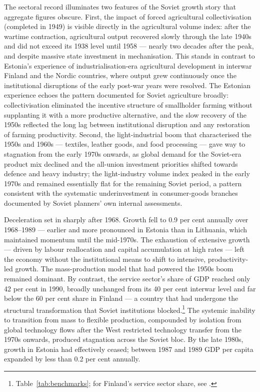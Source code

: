 \documentclass[12pt,a4paper]{article}
\begin{document}
The sectoral record illuminates two features of the Soviet growth story that aggregate figures obscure. First, the impact of forced agricultural collectivisation (completed in 1949) is visible directly in the agricultural volume index: after the wartime contraction, agricultural output recovered slowly through the late 1940s and did not exceed its 1938 level until 1958 — nearly two decades after the peak, and despite massive state investment in mechanisation. This stands in contrast to Estonia's experience of industrialisation-era agricultural development in interwar Finland and the Nordic countries, where output grew continuously once the institutional disruptions of the early post-war years were resolved. The Estonian experience echoes the pattern documented for Soviet agriculture broadly: collectivisation eliminated the incentive structure of smallholder farming without supplanting it with a more productive alternative, and the slow recovery of the 1950s reflected the long lag between institutional disruption and any restoration of farming productivity. Second, the light-industrial boom that characterised the 1950s and 1960s — textiles, leather goods, and food processing — gave way to stagnation from the early 1970s onwards, as global demand for the Soviet-era product mix declined and the all-union investment priorities shifted towards defence and heavy industry; the light-industry volume index peaked in the early 1970s and remained essentially flat for the remaining Soviet period, a pattern consistent with the systematic underinvestment in consumer-goods branches documented by Soviet planners' own internal assessments.

Deceleration set in sharply after 1968. Growth fell to 0.9 per cent annually over 1968--1989 — earlier and more pronounced in Estonia than in Lithuania, which maintained momentum until the mid-1970s. The exhaustion of extensive growth — driven by labour reallocation and capital accumulation at high rates — left the economy without the institutional means to shift to intensive, productivity-led growth. The mass-production model that had powered the 1950s boom remained dominant. By contrast, the service sector's share of GDP reached only 42 per cent in 1990, broadly unchanged from its 40 per cent interwar level and far below the 60 per cent share in Finland — a country that had undergone the structural transformation that Soviet institutions blocked.\footnote{Table~\ref{tab:benchmarks}; for Finland's service sector share, see \autocite[11--12]{ahderajasalu1992}.} The systemic inability to transition from mass to flexible production, compounded by isolation from global technology flows after the West restricted technology transfer from the 1970s onwards, produced stagnation across the Soviet bloc. By the late 1980s, growth in Estonia had effectively ceased; between 1987 and 1989 GDP per capita expanded by less than 0.2 per cent annually.
\end{document}
